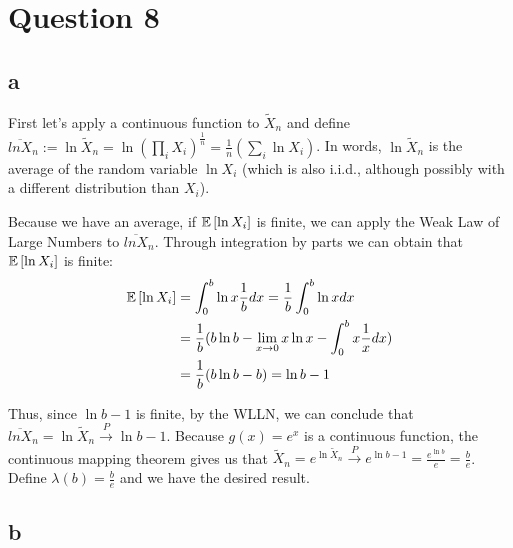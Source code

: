 \documentclass[12pt]{paper}
\begin{document}
\section*{Question 8}

\subsection*{a} 

 First let's apply a continuous function to $\tilde{X}_n$ and define $\overline{lnX}_n:=\ln{\tilde{X}_n}=\ln{(\prod_{i}{X_i})^{\frac{1}{n}}}=\frac{1}{n}(\sum_{i}{\ln{X_i}})$. In words, $\ln{\tilde{X}_n}$ is the average of the random variable $\ln{X_i}$ (which is also i.i.d., although possibly with a different distribution than $X_i$).

Because we have an average, if $\mathbb{E} \left [ \ln{X_i} \right ]$ is finite, we can apply the Weak Law of Large Numbers to $\overline{lnX}_n$. Through integration by parts we can obtain that $\mathbb{E} \left [ \ln{X_i} \right ]$ is finite:
\begin{equation}
\begin{split}
\mathbb{E} \left [ \ln{X_i} \right ]&=\int_{0}^{b}{\ln{x}\frac{1}{b}dx}=\frac{1}{b}\int_{0}^{b}{\ln{x}dx}\\
&=\frac{1}{b}(b\ln{b}-\lim_{x\to0}{x\ln{x}}-\int_{0}^{b}{x\frac{1}{x}dx})\\
&=\frac{1}{b}(b\ln{b}-b)=\ln{b}-1
\end{split}
\end{equation}

Thus, since $\ln{b}-1$ is finite, by the WLLN, we can conclude that $\overline{lnX}_n=\ln{\tilde{X}_n}\overset{P}{\to}\ln{b}-1$. Because $g(x)=e^x$ is a continuous function, the continuous mapping theorem gives us that $\tilde{X}_n=e^{\ln{\tilde{X}_n}}\overset{P}{\to}e^{\ln{b}-1}=\frac{e^{\ln{b}}}{e}=\frac{b}{e}$. Define $\lambda(b)=\frac{b}{e}$ and we have the desired result.

\subsection*{b}
\end{document}
